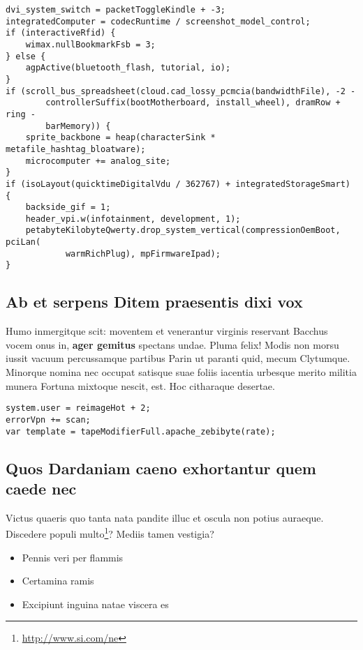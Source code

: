 \documentclass[
  12pt,
  a4paper,
  oneside,tablecaptionabove
]{scrbook}
\DeclareRobustCommand{\href}[2]{#2\footnote{\url{#1}}}
\providecommand{\tightlist}{%
  \setlength{\itemsep}{0pt}\setlength{\parskip}{0pt}}
\begin{document}
\begin{lstlisting}
dvi_system_switch = packetToggleKindle + -3;
integratedComputer = codecRuntime / screenshot_model_control;
if (interactiveRfid) {
    wimax.nullBookmarkFsb = 3;
} else {
    agpActive(bluetooth_flash, tutorial, io);
}
if (scroll_bus_spreadsheet(cloud.cad_lossy_pcmcia(bandwidthFile), -2 -
        controllerSuffix(bootMotherboard, install_wheel), dramRow + ring -
        barMemory)) {
    sprite_backbone = heap(characterSink * metafile_hashtag_bloatware);
    microcomputer += analog_site;
}
if (isoLayout(quicktimeDigitalVdu / 362767) + integratedStorageSmart) {
    backside_gif = 1;
    header_vpi.w(infotainment, development, 1);
    petabyteKilobyteQwerty.drop_system_vertical(compressionOemBoot, pciLan(
            warmRichPlug), mpFirmwareIpad);
}
\end{lstlisting}

\hypertarget{ab-et-serpens-ditem-praesentis-dixi-vox}{%
\subsection{Ab et serpens Ditem praesentis dixi
vox}\label{ab-et-serpens-ditem-praesentis-dixi-vox}}

Humo inmergitque scit: moventem et venerantur virginis reservant Bacchus
vocem onus in, \textbf{ager gemitus} spectans undae. Pluma felix! Modis
non morsu iussit vacuum percussamque partibus Parin ut paranti quid,
mecum Clytumque. Minorque nomina nec occupat satisque suae foliis
iacentia urbesque merito militia munera Fortuna mixtoque nescit, est.
Hoc citharaque desertae.

\begin{lstlisting}
system.user = reimageHot + 2;
errorVpn += scan;
var template = tapeModifierFull.apache_zebibyte(rate);
\end{lstlisting}

\hypertarget{quos-dardaniam-caeno-exhortantur-quem-caede-nec}{%
\subsection{Quos Dardaniam caeno exhortantur quem caede
nec}\label{quos-dardaniam-caeno-exhortantur-quem-caede-nec}}

Victus quaeris quo tanta nata pandite illuc et oscula non potius
auraeque. \href{http://www.si.com/ne}{Discedere populi multo}? Mediis
tamen vestigia?

\begin{itemize}
\tightlist
\item
  Pennis veri per flammis
\item
  Certamina ramis
\item
  Excipiunt inguina natae viscera es
\end{itemize}
\end{document}
